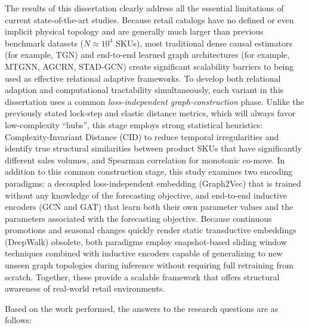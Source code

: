 The results of this dissertation clearly address all the essential limitations of current state-of-the-art studies. Because retail catalogs have no defined or even implicit physical topology and are generally much larger than previous benchmark datasets ($N \approx 10^4$ SKUs), most traditional dense causal estimators (for example, TGN) and end-to-end learned graph architectures (for example, MTGNN, AGCRN, STAD-GCN) create significant scalability barriers to being used as effective relational adaptive frameworks. To develop both relational adaption and computational tractability simultaneously, each variant in this dissertation uses a common \emph{loss-independent graph-construction} phase. Unlike the previously stated lock-step and elastic distance metrics, which will always favor low-complexity ``hubs'', this stage employs strong statistical heuristics: Complexity-Invariant Distance (CID) to reduce temporal irregularities and identify true structural similarities between product SKUs that have significantly different sales volumes, and Spearman correlation for monotonic co-move. In addition to this common construction stage, this study examines two encoding paradigms: a decoupled loss-independent embedding (Graph2Vec) that is trained without any knowledge of the forecasting objective, and end-to-end inductive encoders (GCN and GAT) that learn both their own parameter values and the parameters associated with the forecasting objective. Because continuous promotions and seasonal changes quickly render static transductive embeddings (DeepWalk) obsolete, both paradigms employ snapshot-based sliding window techniques combined with inductive encoders capable of generalizing to new unseen graph topologies during inference without requiring full retraining from scratch. Together, these provide a scalable framework that offers structural awareness of real-world retail environments.


Based on the work performed, the answers to the research questions are as follows:

